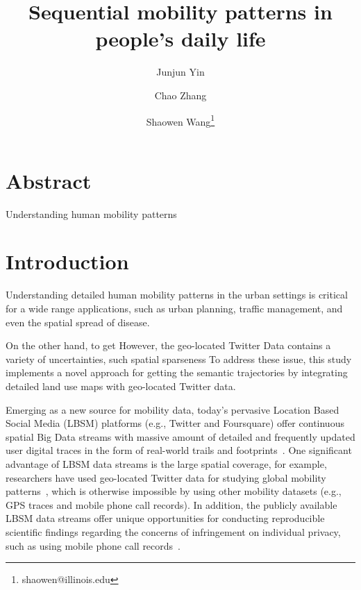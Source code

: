 \documentclass[a4paper,11pt]{article}
\begin{document}
\title{Sequential mobility patterns in people's daily life}
\author[1]{Junjun Yin}
\author[2]{Chao Zhang}
\author[1]{Shaowen Wang\thanks{shaowen@illinois.edu}}

\renewcommand\Authands{ and }


\maketitle

\section*{\centering Abstract}
Understanding human mobility patterns 


\section*{Introduction}
Understanding detailed human mobility patterns in the urban settings is critical for a wide range applications, such as urban planning, traffic management, and even the spatial spread of disease.

On the other hand, to get 
However, the geo-located Twitter Data contains a variety of uncertainties, such spatial sparseness
To address these issue, this study implements a novel approach for getting the semantic trajectories by integrating detailed land use maps with geo-located Twitter data.

Emerging as a new source for mobility data, today's pervasive Location Based Social Media (LBSM) platforms (e.g., Twitter and Foursquare) offer continuous spatial Big Data streams with massive amount of detailed and frequently updated user digital traces in the form of real-world trails and footprints~\cite{thatcher2014}.
One significant advantage of LBSM data streams is the large spatial coverage, for example, researchers have used geo-located Twitter data for studying global mobility patterns~\cite{hawelka2014geo}, which is otherwise impossible by using other mobility datasets (e.g., GPS traces and mobile phone call records). 
In addition, the publicly available LBSM data streams offer unique opportunities for conducting reproducible scientific findings regarding the concerns of infringement on individual privacy, such as using mobile phone call records~\cite{giannotti2008mobility,crampton2014collect,Jurdak2015}.
\end{document}
